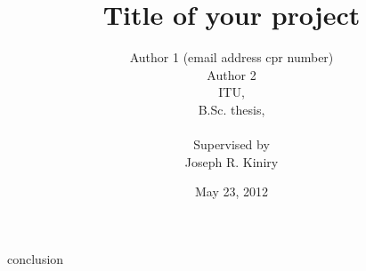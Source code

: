\documentclass[12pt,a4paper]{report}
\author{Author 1 (email address cpr number) \\ Author 2 \\ 
		ITU, \\
		B.Sc. thesis, \\ \\
		Supervised by \\
		Joseph R. Kiniry}
\title{Title of your project}
\date{May 23, 2012}
\begin{document}
\maketitle

\tableofcontents



{conclusion}



\end{document}
